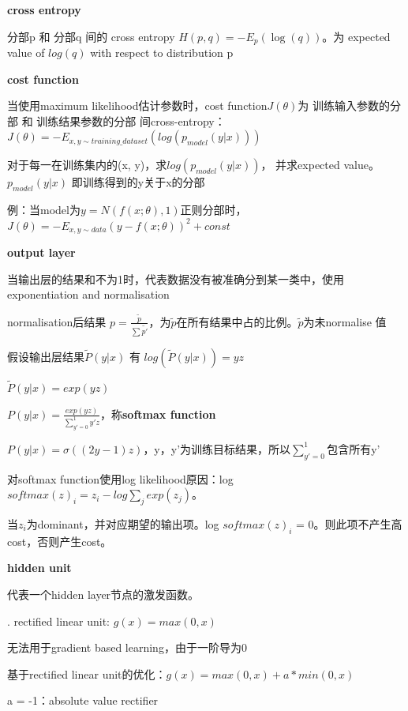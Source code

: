 \documentclass[UTF8]{ctexart}
\begin{document}
  \textbf{cross entropy}

  \quad 分部p 和 分部q 间的 cross entropy $H(p, q) = -E_p(\log (q))$。为 expected value of $log (q)$ with respect to distribution p

  \textbf{cost function}

  \quad 当使用maximum likelihood估计参数时，cost function$J(\theta )$为 训练输入参数的分部 和 训练结果参数的分部 间cross-entropy： $J(\theta ) = -E_{x, y\sim training\_dataset}(log (p_{model}(y | x)))$

  \quad \quad 对于每一在训练集内的(x, y)，求$log (p_{model}(y | x))$， 并求expected value。$p_{model}(y | x)$ 即训练得到的y关于x的分部

  \quad \quad 例：当model为$y = N(f(x; \theta), 1)$正则分部时，$J(\theta) = -E_{x, y\sim data}(y - f(x;\theta))^2 + const$

  \textbf{output layer}

  \quad 当输出层的结果和不为1时，代表数据没有被准确分到某一类中，使用exponentiation and normalisation

  \quad \quad normalisation后结果 $p = \frac{\tilde{p} }{\sum \tilde{p'} } $，为$\tilde{p} $在所有结果中占的比例。$\tilde{p} $为未normalise 值

  \quad 假设输出层结果$\tilde{P} (y | x)$ 有 $log(\tilde{P} (y | x)) = yz$

  \quad \quad $\tilde{P} (y | x) = exp(yz)$

  \quad \quad $P (y | x) = \frac{exp(yz)}{\sum_{y' = 0}^{1} y'z } $，称\textbf{softmax function}

  \quad \quad $P (y | x) = \sigma ((2y - 1)z)$，y，y'为训练目标结果，所以$\sum_{y' = 0}^{1} $包含所有y'

  \quad 对softmax function使用log likelihood原因：log $softmax(z)_i = z_i - log\sum_j exp(z_j)$。

  \quad \quad 当$z_i$为dominant，并对应期望的输出项。log $softmax(z)_i$ = 0。则此项不产生高cost，否则产生cost。

  \textbf{hidden unit}

  \quad \quad 代表一个hidden layer节点的激发函数。

  \quad {}. rectified linear unit: $g(x) = max(0, x)$

  \quad \quad \quad 无法用于gradient based learning，由于一阶导为0

  \quad \quad \quad 基于rectified linear unit的优化：$g(x) = max(0, x) + a*min(0, x)$

  \quad \quad \quad \quad a = -1：absolute value rectifier
\end{document}
